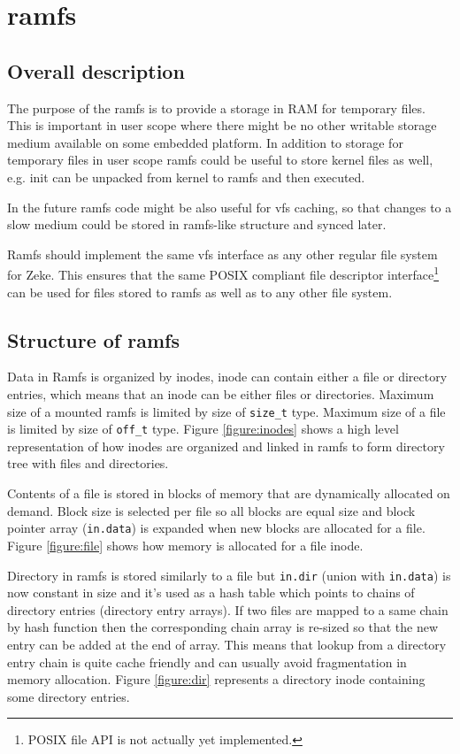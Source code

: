\chapter{ramfs}

\section{Overall description}

The purpose of the \acs{ramfs} is to provide a storage in RAM for temporary
files. This is important in user scope where there might be no other writable
storage medium available on some embedded platform. In addition to storage
for temporary files in user scope ramfs could be useful to store kernel files
as well, e.g. init can be unpacked from kernel to ramfs and then executed.

In the future ramfs code might be also useful for \acs{vfs} caching, so that
changes to a slow medium could be stored in ramfs-like structure and synced
later.

Ramfs should implement the same \acs{vfs} interface as any other regular
file system for Zeke. This ensures that the same POSIX compliant file
descriptor interface\footnote{POSIX file API is not actually yet implemented.}
can be used for files stored to ramfs as well as to any other file system.

\section{Structure of ramfs}

Data in Ramfs is organized by inodes, \acs{inode} can contain either a file or
directory entries, which means that an inode can be either files or directories.
Maximum size of a mounted ramfs is limited by size of \verb+size_t+ type.
Maximum size of a file is limited by size of \verb+off_t+ type. Figure
\ref{figure:inodes} shows a high level representation of how inodes are
organized and linked in ramfs to form directory tree with files and directories.

Contents of a file is stored in blocks of memory that are dynamically allocated
on demand. Block size is selected per file so all blocks are equal size and
block pointer array (\verb+in.data+) is expanded when new blocks are allocated
for a file. Figure \ref{figure:file} shows how memory is allocated for a file
inode.

Directory in ramfs is stored similarly to a file but \verb+in.dir+ (union with
\verb+in.data+) is now constant in size and it's used as a hash table which
points to chains of directory entries (directory entry arrays). If two files are
mapped to a same chain by hash function then the corresponding chain array is
re-sized so that the new entry can be added at the end of array. This means that
lookup from a directory entry chain is quite cache friendly and can usually
avoid fragmentation in memory allocation. Figure \ref{figure:dir} represents a
directory inode containing some directory entries.

